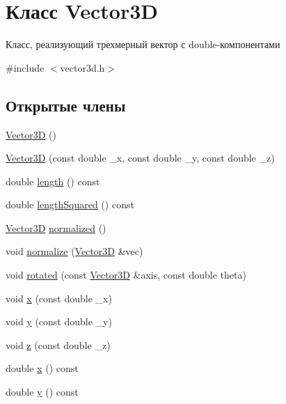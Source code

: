 \hypertarget{class_vector3_d}{}\section{Класс Vector3D}
\label{class_vector3_d}


Класс, реализующий трехмерный вектор с double-\/компонентами  




{\ttfamily \#include $<$vector3d.\+h$>$}

\subsection*{Открытые члены}
\begin{DoxyCompactItemize}
\item 
\mbox{\hyperlink{class_vector3_d_a0b11a8d75da427b27443d8a94d0d296c}{Vector3D}} ()
\item 
\mbox{\hyperlink{class_vector3_d_ae515779735e4910e8861bbaa746b6e30}{Vector3D}} (const double \+\_\+x, const double \+\_\+y, const double \+\_\+z)
\item 
double \mbox{\hyperlink{class_vector3_d_a4ddb90e85e10f0f32475725cb966a5ce}{length}} () const
\item 
double \mbox{\hyperlink{class_vector3_d_a07018ea108ca8aa4d64388fcb30b02bc}{length\+Squared}} () const
\item 
\mbox{\hyperlink{class_vector3_d}{Vector3D}} \mbox{\hyperlink{class_vector3_d_af0693e0fd4ccc98bab05cc2e09916d0a}{normalized}} ()
\item 
void \mbox{\hyperlink{class_vector3_d_acee0e4ffb2a89c454b1d68e0c01e511b}{normalize}} (\mbox{\hyperlink{class_vector3_d}{Vector3D}} \&vec)
\item 
void \mbox{\hyperlink{class_vector3_d_a16dc9dadadf511465fea472f8c436cde}{rotated}} (const \mbox{\hyperlink{class_vector3_d}{Vector3D}} \&axis, const double theta)
\item 
void \mbox{\hyperlink{class_vector3_d_ae381f80124491707b36640a488515b61}{x}} (const double \+\_\+x)
\item 
void \mbox{\hyperlink{class_vector3_d_a70ea2945f8197058fb2426c2a2c08bf2}{y}} (const double \+\_\+y)
\item 
void \mbox{\hyperlink{class_vector3_d_a08e854517896eedfaf20fc059e6ba468}{z}} (const double \+\_\+z)
\item 
double \mbox{\hyperlink{class_vector3_d_ac86d9a556616f4c51fecbaf7d8658ce8}{x}} () const
\item 
double \mbox{\hyperlink{class_vector3_d_a7146d35db2c1bf7606c8290282a423ec}{y}} () const

\end{DoxyCompactItemize}
